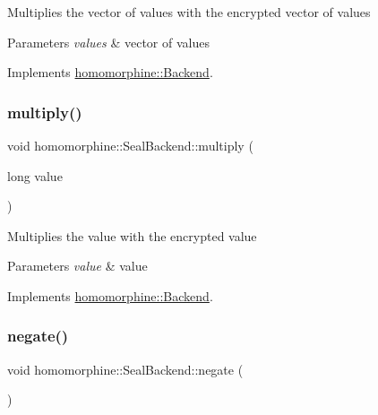 Multiplies the vector of values with the encrypted vector of values


\begin{DoxyParams}{Parameters}
{\em values} & vector of values \\
\hline
\end{DoxyParams}


Implements \mbox{\hyperlink{classhomomorphine_1_1_backend_a716a0d366daf9a6491ba4d33ebb57d41}{homomorphine\+::\+Backend}}.

\mbox{\label{classhomomorphine_1_1_seal_backend_afd8f13068d81c0038b966df4219e8033}} 
\subsubsection{\texorpdfstring{multiply()}{multiply()}\hspace{0.1cm}{\footnotesize\ttfamily [2/2]}}
{\footnotesize\ttfamily void homomorphine\+::\+Seal\+Backend\+::multiply (\begin{DoxyParamCaption}\item[{long}]{value }\end{DoxyParamCaption})\hspace{0.3cm}{\ttfamily [virtual]}}

Multiplies the value with the encrypted value


\begin{DoxyParams}{Parameters}
{\em value} & value \\
\hline
\end{DoxyParams}


Implements \mbox{\hyperlink{classhomomorphine_1_1_backend_a8b09933415165eb84234d9ccfbf2c3c4}{homomorphine\+::\+Backend}}.

\mbox{\label{classhomomorphine_1_1_seal_backend_a9064cf9822de85af9120528cef084bea}} 
\subsubsection{\texorpdfstring{negate()}{negate()}}
{\footnotesize\ttfamily void homomorphine\+::\+Seal\+Backend\+::negate (\begin{DoxyParamCaption}{ }\end{DoxyParamCaption})\hspace{0.3cm}{\ttfamily [virtual]}}

